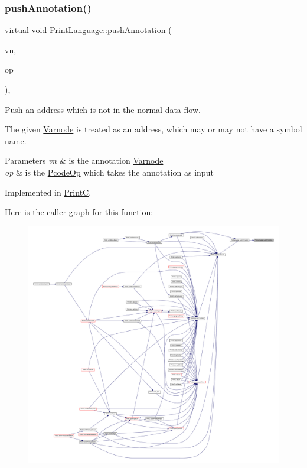 \subsubsection{\texorpdfstring{pushAnnotation()}{pushAnnotation()}}
{\footnotesize\ttfamily virtual void Print\+Language\+::push\+Annotation (\begin{DoxyParamCaption}\item[{const \mbox{\hyperlink{class_varnode}{Varnode}} $\ast$}]{vn,  }\item[{const \mbox{\hyperlink{class_pcode_op}{Pcode\+Op}} $\ast$}]{op }\end{DoxyParamCaption})\hspace{0.3cm}{\ttfamily [protected]}, {}}



Push an address which is not in the normal data-\/flow. 

The given \mbox{\hyperlink{class_varnode}{Varnode}} is treated as an address, which may or may not have a symbol name. 
\begin{DoxyParams}{Parameters}
{\em vn} & is the annotation \mbox{\hyperlink{class_varnode}{Varnode}} \\
\hline
{\em op} & is the \mbox{\hyperlink{class_pcode_op}{Pcode\+Op}} which takes the annotation as input \\
\hline
\end{DoxyParams}


Implemented in \mbox{\hyperlink{class_print_c_a234b95d9f3fdb8a79eeff02eb4acbca3}{PrintC}}.

Here is the caller graph for this function\+:
\nopagebreak
\begin{figure}[H]
\begin{center}
\leavevmode
\includegraphics[width=350pt]{class_print_language_a08b82dcc9073756390dbee98a85d9a95_icgraph}
\end{center}
\end{figure}
\mbox{\label{class_print_language_abeb8a9774fbf1dcb700be292a7e10be8}} 
